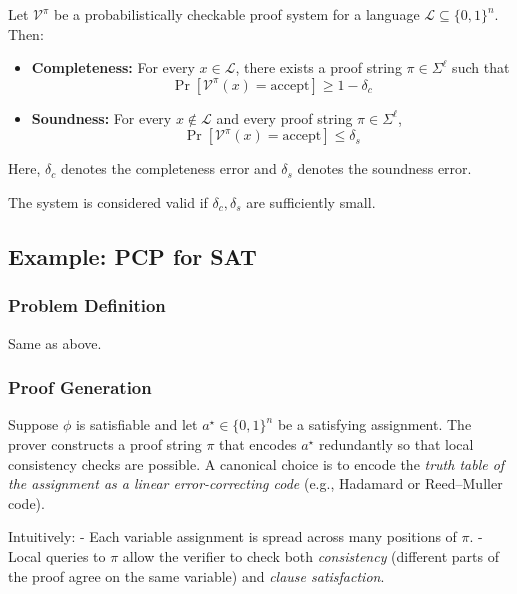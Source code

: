 \begin{definition}
Let $\mathcal{V}^{\pi}$ be a probabilistically checkable proof system for a language $\mathcal{L} \subseteq \{0,1\}^n$. Then:

\begin{itemize}
    \item \textbf{Completeness:} For every $x \in \mathcal{L}$, there exists a proof string $\pi \in \Sigma^\ell$ such that
    \[
    \Pr[\mathcal{V}^\pi(x) = \text{accept}] \ge 1 - \delta_c
    \]
    
    \item \textbf{Soundness:} For every $x \notin \mathcal{L}$ and every proof string $\pi \in \Sigma^\ell$,
    \[
    \Pr[\mathcal{V}^\pi(x) = \text{accept}] \le \delta_s
    \]
\end{itemize}

Here, $\delta_c$ denotes the completeness error and  $\delta_s$ denotes the soundness error.  
\end{definition}

\begin{remark}
The system is considered valid if $\delta_c, \delta_s$ are sufficiently small.
\end{remark} 

\subsection*{Example: PCP for SAT}

\subsubsection*{Problem Definition}

Same as above.


\myspace

\subsubsection*{Proof Generation}

Suppose $\phi$ is satisfiable and let $a^\star \in \{0,1\}^n$ be a satisfying assignment. The prover constructs a proof string $\pi$ that encodes $a^\star$ redundantly so that local consistency checks are possible. A canonical choice is to encode the \emph{truth table of the assignment as a linear error-correcting code} (e.g., Hadamard or Reed–Muller code).

Intuitively:
- Each variable assignment is spread across many positions of $\pi$.  
- Local queries to $\pi$ allow the verifier to check both \emph{consistency} (different parts of the proof agree on the same variable) and \emph{clause satisfaction}.  

